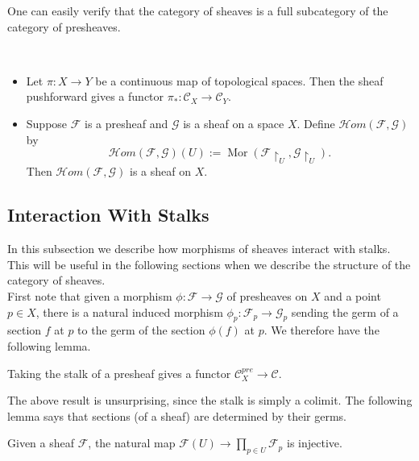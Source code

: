 \documentclass[11pt,openany]{book} %
\begin{document}
One can easily verify that the category of sheaves is a full subcategory of the category of presheaves.\\

\begin{example}\
\begin{itemize}
	\item Let $\pi : X \to Y$ be a continuous map of topological spaces. Then the sheaf pushforward gives a functor $\pi_* : \mathcal{C}_X \to \mathcal{C}_Y$.
    \item Suppose $\mathcal{F}$ is a presheaf and $\mathcal{G}$ is a sheaf on a space $X$. Define $\mathcal{H}om(\mathcal{F},\mathcal{G})$ by
    \[
    \mathcal{H}om(\mathcal{F},\mathcal{G})(U) := \operatorname{Mor}(\mathcal{F}\restriction_U,\mathcal{G}\restriction_U).
    \]
    Then $\mathcal{H}om(\mathcal{F},\mathcal{G})$ is a sheaf on $X$.
\end{itemize}
\end{example}

\subsection{Interaction With Stalks}
In this subsection we describe how morphisms of sheaves interact with stalks. This will be useful in the following sections when we describe the structure of the category of sheaves.\\

First note that given a morphism $\phi : \mathcal{F} \to \mathcal{G}$ of presheaves on $X$ and a point $p \in X$, there is a natural induced morphism $\phi_p : \mathcal{F}_p \to \mathcal{G}_p$ sending the germ of a section $f$ at $p$ to the germ of the section $\phi(f)$ at $p$. We therefore have the following lemma.\\

\begin{lemma}
Taking the stalk of a presheaf gives a functor $\mathcal{C}_X^{pre} \to \mathcal{C}$.
\end{lemma}

\medskip
The above result is unsurprising, since the stalk is simply a colimit. The following lemma says that sections (of a sheaf) are determined by their germs.\\

\begin{lemma} \label{injstalk}
Given a sheaf $\mathcal{F}$, the natural map $\mathcal{F}(U) \to \prod_{p \in U} \mathcal{F}_p$ is injective.
\end{lemma}
\end{document}
